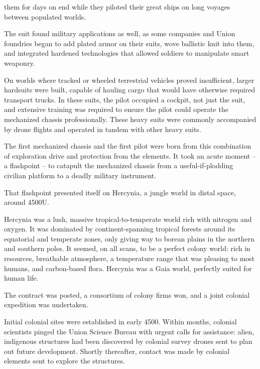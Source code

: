                                                                                                            


them for days on end while they piloted their great ships on long voyages between populated  
worlds. 
 

The suit found military applications as well, as some companies and Union foundries began to  
add plated armor on their suits, wove ballistic knit into them, and integrated hardened  
technologies that allowed soldiers to manipulate smart weaponry.    
 

On worlds where tracked or wheeled terrestrial vehicles proved insufficient, larger hardsuits were  
built, capable of hauling cargo that would have otherwise required transport trucks. In these  
suits, the pilot occupied a cockpit, not just the suit, and extensive training was required to ensure  
the pilot could operate the mechanized chassis professionally. These heavy suits were commonly  
accompanied by drone flights and operated in tandem with other heavy suits.  
 

The first mechanized chassis and the first pilot were born from this combination of exploration  
drive and protection from the elements. It took an acute moment -- a flashpoint -- to catapult the  
mechanized chassis from a useful-if-plodding civilian platform to a deadly military instrument. 
 

That flashpoint presented itself on Hercynia, a jungle world in distal space, around 4500U.    
 

Hercynia was a lush, massive tropical-to-temperate world rich with nitrogen and oxygen. It was  
dominated by continent-spanning tropical forests around its equatorial and temperate zones,  
only giving way to borean plains in the northern and southern poles. It seemed, on all scans, to  
be a perfect colony world: rich in resources, breathable atmosphere, a temperature range that  
was pleasing to most humans, and carbon-based flora. Hercynia was a Gaia world, perfectly  
suited for human life.
 

The contract was posted, a consortium of colony firms won, and a joint colonial expedition was  
undertaken. 
 

Initial colonial sites were established in early 4500. Within months, colonial scientists pinged the  
Union Science Bureau with urgent calls for assistance: alien, indigenous structures had been  
discovered by colonial survey drones sent to plan out future development. Shortly thereafter,  
contact was made by colonial elements sent to explore the structures. 
 

